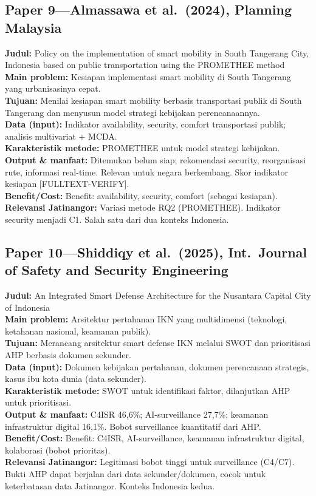 \documentclass[a4paper,11pt]{article}
\begin{document}
\subsection*{Paper 9---Almassawa et al.\ (2024), Planning Malaysia}
\textbf{Judul:} Policy on the implementation of smart mobility in South Tangerang City, Indonesia based on public transportation using the PROMETHEE method\\
\textbf{Main problem:} Kesiapan implementasi smart mobility di South Tangerang yang urbanisasinya cepat.\\
\textbf{Tujuan:} Menilai kesiapan smart mobility berbasis transportasi publik di South Tangerang dan menyusun model strategi kebijakan perencanaannya.\\
\textbf{Data (input):} Indikator availability, security, comfort transportasi publik; analisis multivariat + MCDA.\\
\textbf{Karakteristik metode:} PROMETHEE untuk model strategi kebijakan.\\
\textbf{Output \& manfaat:} Ditemukan belum siap; rekomendasi security, reorganisasi rute, informasi real-time. Relevan untuk negara berkembang. Skor indikator kesiapan [FULLTEXT-VERIFY].\\
\textbf{Benefit/Cost:} Benefit: availability, security, comfort (sebagai kesiapan).\\
\textbf{Relevansi Jatinangor:} Variasi metode RQ2 (PROMETHEE). Indikator security menjadi C1. Salah satu dari dua konteks Indonesia.

\subsection*{Paper 10---Shiddiqy et al.\ (2025), Int.\ Journal of Safety and Security Engineering}
\textbf{Judul:} An Integrated Smart Defense Architecture for the Nusantara Capital City of Indonesia\\
\textbf{Main problem:} Arsitektur pertahanan IKN yang multidimensi (teknologi, ketahanan nasional, keamanan publik).\\
\textbf{Tujuan:} Merancang arsitektur smart defense IKN melalui SWOT dan prioritisasi AHP berbasis dokumen sekunder.\\
\textbf{Data (input):} Dokumen kebijakan pertahanan, dokumen perencanaan strategis, kasus ibu kota dunia (data sekunder).\\
\textbf{Karakteristik metode:} SWOT untuk identifikasi faktor, dilanjutkan AHP untuk prioritisasi.\\
\textbf{Output \& manfaat:} C4ISR 46,6\%; AI-surveillance 27,7\%; keamanan infrastruktur digital 16,1\%. Bobot surveillance kuantitatif dari AHP.\\
\textbf{Benefit/Cost:} Benefit: C4ISR, AI-surveillance, keamanan infrastruktur digital, kolaborasi (bobot prioritas).\\
\textbf{Relevansi Jatinangor:} Legitimasi bobot tinggi untuk surveillance (C4/C7). Bukti AHP dapat berjalan dari data sekunder/dokumen, cocok untuk keterbatasan data Jatinangor. Konteks Indonesia kedua.
\end{document}
